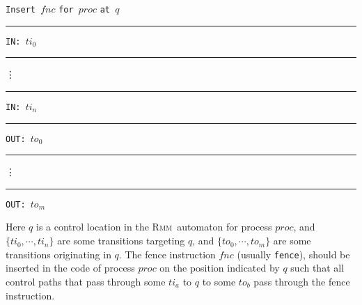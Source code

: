 \documentclass[a4paper]{article}
\newcommand{\rmm}{\textsc{Rmm}}
\begin{document}
\vspace{10pt}

\noindent
{\tt Insert }$fnc$ {\tt for }$proc$ {\tt at }$q$\\
\rule{10pt}{0pt}{\tt IN: }$ti_0$\\
\rule{10pt}{0pt}\vdots\\
\rule{10pt}{0pt}{\tt IN: }$ti_n$\\
\rule{10pt}{0pt}{\tt OUT: }$to_0$\\
\rule{10pt}{0pt}\vdots\\
\rule{10pt}{0pt}{\tt OUT: }$to_m$\\

\vspace{10pt}

Here $q$ is a control location in the \rmm\ automaton for process
$proc$, and $\{ti_0,\cdots,ti_n\}$ are some transitions targeting $q$,
and $\{to_0,\cdots,to_m\}$ are some transitions originating in
$q$.
%
The fence instruction $fnc$ (usually {\tt fence}), should be inserted
in the code of process $proc$ on the position indicated by $q$ such
that all control paths that pass through some $ti_a$ to $q$ to some
$to_b$ pass through the fence instruction.

{}



\pagebreak
{}
{}

\end{document}
